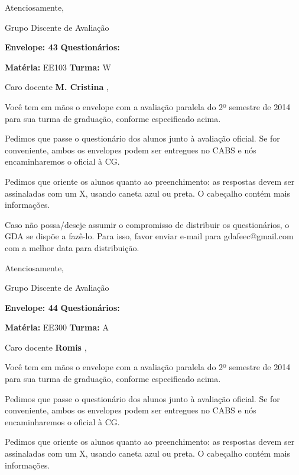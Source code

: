 \documentclass[a5paper]{letter}
\begin{document}
Atenciosamente, 

Grupo Discente de Avaliação

\vspace{0.5cm}

{\bf Envelope: 43 }		\hfill	{\bf Questionários:} \hspace{2cm}

\newpage
\thispagestyle{empty}

\hfill {\bf Matéria:} EE103 {\bf Turma:} W

Caro docente {\bf M. Cristina }, 

	Você tem em mãos o envelope com a avaliação paralela do 2º semestre de 2014 para sua turma de graduação, conforme especificado acima.

	Pedimos que passe o questionário dos alunos junto à avaliação oficial. Se for conveniente, ambos os envelopes podem ser entregues no CABS e nós encaminharemos o oficial à CG.

Pedimos que oriente os alunos quanto ao preenchimento: as respostas devem ser assinaladas com um X, usando caneta azul ou preta. O cabeçalho contém mais informações.

	Caso não possa/deseje assumir o compromisso de distribuir os questionários, o GDA se dispõe a fazê-lo. Para isso, favor enviar e-mail para gdafeec@gmail.com com a melhor data para distribuição.


Atenciosamente, 

Grupo Discente de Avaliação

\vspace{0.5cm}

{\bf Envelope: 44 }		\hfill	{\bf Questionários:} \hspace{2cm}

\newpage
\thispagestyle{empty}

\hfill {\bf Matéria:} EE300 {\bf Turma:} A

Caro docente {\bf Romis }, 

	Você tem em mãos o envelope com a avaliação paralela do 2º semestre de 2014 para sua turma de graduação, conforme especificado acima.

	Pedimos que passe o questionário dos alunos junto à avaliação oficial. Se for conveniente, ambos os envelopes podem ser entregues no CABS e nós encaminharemos o oficial à CG.

Pedimos que oriente os alunos quanto ao preenchimento: as respostas devem ser assinaladas com um X, usando caneta azul ou preta. O cabeçalho contém mais informações.
\end{document}
